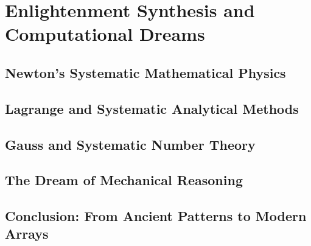 \documentclass[12pt, oneside, openany]{book}
\begin{document}
\chapter{Enlightenment Synthesis and Computational Dreams}

\section{Newton's Systematic Mathematical Physics}

\section{Lagrange and Systematic Analytical Methods}

\section{Gauss and Systematic Number Theory}

\section{The Dream of Mechanical Reasoning}

\section*{Conclusion: From Ancient Patterns to Modern Arrays}
\end{document}
